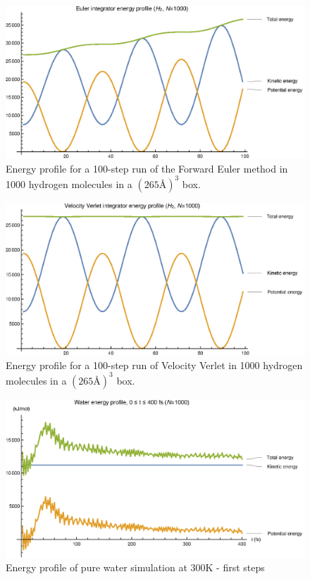 \documentclass[11pt,a4paper]{article}
\begin{document}
\begin{figure}
\centering
\includegraphics[scale=0.8]{figures/inteuler}
\caption{Energy profile for a 100-step run of the Forward Euler method in 1000 hydrogen molecules in a $\left(265\text{\AA}\right)^3$ box.}\label{fig:inteuler}
\end{figure}

\begin{figure}
\centering
\includegraphics[scale=0.8]{figures/intvv}
\caption{Energy profile for a 100-step run of Velocity Verlet in 1000 hydrogen molecules in a $\left(265\text{\AA}\right)^3$ box.}\label{fig:intvv}
\end{figure}

\begin{figure}
\centering
\includegraphics[scale=0.8]{figures/ewater1}
\caption{Energy profile of pure water simulation at 300K - first steps}\label{fig:ewater1}
\end{figure}
\end{document}

